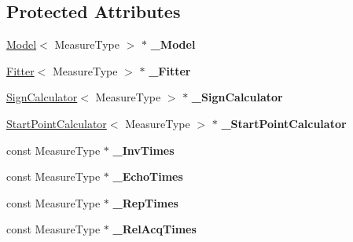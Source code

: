 \subsection*{Protected Attributes}
\begin{DoxyCompactItemize}
\item 
\hyperlink{class_ox_1_1_model}{Model}$<$ Measure\+Type $>$ $\ast$ {\bfseries \+\_\+\+Model}\hypertarget{class_ox_1_1_calculator_a37dee4f1bb2fcae66c6710a642fe6d7b}{}\label{class_ox_1_1_calculator_a37dee4f1bb2fcae66c6710a642fe6d7b}

\item 
\hyperlink{class_ox_1_1_fitter}{Fitter}$<$ Measure\+Type $>$ $\ast$ {\bfseries \+\_\+\+Fitter}\hypertarget{class_ox_1_1_calculator_ae00ef8e7db2e9eaa86b8649815246bf9}{}\label{class_ox_1_1_calculator_ae00ef8e7db2e9eaa86b8649815246bf9}

\item 
\hyperlink{class_ox_1_1_sign_calculator}{Sign\+Calculator}$<$ Measure\+Type $>$ $\ast$ {\bfseries \+\_\+\+Sign\+Calculator}\hypertarget{class_ox_1_1_calculator_a0655f664d37e70e589bb8526175f19bb}{}\label{class_ox_1_1_calculator_a0655f664d37e70e589bb8526175f19bb}

\item 
\hyperlink{class_ox_1_1_start_point_calculator}{Start\+Point\+Calculator}$<$ Measure\+Type $>$ $\ast$ {\bfseries \+\_\+\+Start\+Point\+Calculator}\hypertarget{class_ox_1_1_calculator_a8873b376837e41f40e2a9286a9ea5896}{}\label{class_ox_1_1_calculator_a8873b376837e41f40e2a9286a9ea5896}

\item 
const Measure\+Type $\ast$ {\bfseries \+\_\+\+Inv\+Times}\hypertarget{class_ox_1_1_calculator_ab5f694e40a431677359b6933154eebc0}{}\label{class_ox_1_1_calculator_ab5f694e40a431677359b6933154eebc0}

\item 
const Measure\+Type $\ast$ {\bfseries \+\_\+\+Echo\+Times}\hypertarget{class_ox_1_1_calculator_acc5f2033f9e72e394abae75abdb70076}{}\label{class_ox_1_1_calculator_acc5f2033f9e72e394abae75abdb70076}

\item 
const Measure\+Type $\ast$ {\bfseries \+\_\+\+Rep\+Times}\hypertarget{class_ox_1_1_calculator_acaa46125d5a97260020dcb8e880d8ca4}{}\label{class_ox_1_1_calculator_acaa46125d5a97260020dcb8e880d8ca4}

\item 
const Measure\+Type $\ast$ {\bfseries \+\_\+\+Rel\+Acq\+Times}\hypertarget{class_ox_1_1_calculator_adc51d44af4e1e42ccda6e49efd618d07}{}\label{class_ox_1_1_calculator_adc51d44af4e1e42ccda6e49efd618d07}


\end{DoxyCompactItemize}
